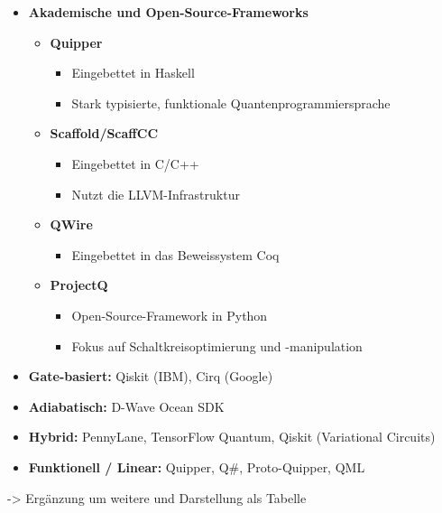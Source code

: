 \begin{itemize}
    \item \textbf{Akademische und Open-Source-Frameworks}
    \begin{itemize}
        \item \textbf{Quipper}
        \begin{itemize}
            \item Eingebettet in Haskell
            \item Stark typisierte, funktionale Quantenprogrammiersprache
        \end{itemize}
        
        \item \textbf{Scaffold/ScaffCC}
        \begin{itemize}
            \item Eingebettet in C/C++
            \item Nutzt die LLVM-Infrastruktur
        \end{itemize}
        
        \item \textbf{QWire}
        \begin{itemize}
            \item Eingebettet in das Beweissystem Coq
        \end{itemize}
        
        \item \textbf{ProjectQ}
        \begin{itemize}
            \item Open-Source-Framework in Python
            \item Fokus auf Schaltkreisoptimierung und -manipulation
        \end{itemize}
    \end{itemize}
\end{itemize}

\begin{itemize}
    \item \textbf{Gate-basiert:} Qiskit (IBM), Cirq (Google)
    \item \textbf{Adiabatisch:} D-Wave Ocean SDK
    \item \textbf{Hybrid:} PennyLane, TensorFlow Quantum, Qiskit (Variational Circuits)
    \item \textbf{Funktionell / Linear:} Quipper, Q\#, Proto-Quipper, QML
\end{itemize}
-> Ergänzung um weitere und Darstellung als Tabelle

